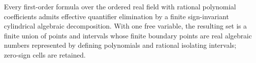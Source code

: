 Every first-order formula over the ordered real field with rational polynomial coefficients admits effective quantifier elimination by a finite sign-invariant cylindrical algebraic decomposition.  With one free variable, the resulting set is a finite union of points and intervals whose finite boundary points are real algebraic numbers represented by defining polynomials and rational isolating intervals; zero-sign cells are retained.